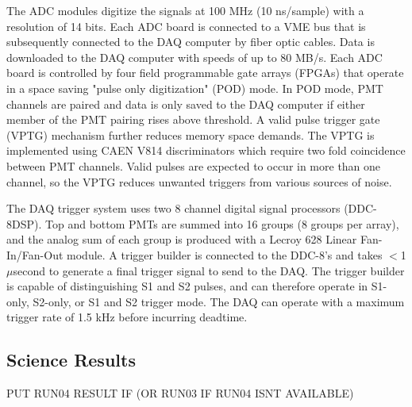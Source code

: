The ADC modules digitize the signals at 100 MHz (10 ns/sample) with a resolution of 14 bits. Each ADC board is connected to a VME bus that is subsequently connected to the DAQ computer by fiber optic cables.  Data is downloaded to the DAQ computer with speeds of up to 80 MB/s.  Each ADC board is controlled by four field programmable gate arrays (FPGAs) that operate in a space saving "pulse only digitization" (POD) mode. In POD mode, PMT channels are paired and data is only saved to the DAQ computer if either member of the PMT pairing rises above threshold. A valid pulse trigger gate (VPTG) mechanism further reduces memory space demands.  The VPTG is implemented using CAEN V814 discriminators which require two fold coincidence between PMT channels. Valid pulses are expected to occur in more than one channel, so the VPTG reduces unwanted triggers from various sources of noise.

The DAQ trigger system uses two 8 channel digital signal processors (DDC-8DSP).  
Top and bottom PMTs are summed into 16 groups (8 groups per array), and the analog sum of each group is produced with a Lecroy 628 Linear Fan-In/Fan-Out module.  
A trigger builder is connected to the DDC-8’s and takes $<$1 $\mu$second to generate a final trigger signal to send to the DAQ.  The trigger builder is capable of distinguishing S1 and S2 pulses, and can therefore operate in S1-only, S2-only, or S1 and S2 trigger mode.  The DAQ can operate with a maximum trigger rate of 1.5 kHz before incurring deadtime. 

\subsection{Science Results}

PUT RUN04 RESULT IF (OR RUN03 IF RUN04 ISNT AVAILABLE)

